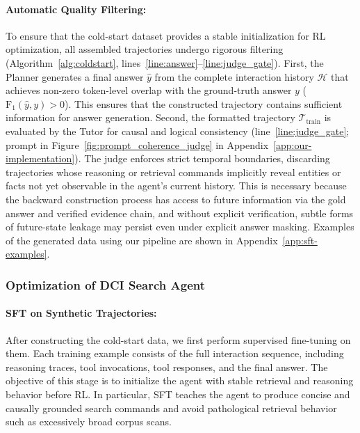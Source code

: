 \documentclass{article} %
\begin{document}
\paragraph{Automatic Quality Filtering:}

To ensure that the cold-start dataset provides a stable initialization for RL optimization, all assembled trajectories undergo rigorous filtering (Algorithm~\ref{alg:coldstart}, lines~\ref{line:answer}--\ref{line:judge_gate}). First, the Planner generates a final answer $\hat{y}$ from the complete interaction history $\mathcal{H}$ that achieves non-zero token-level overlap with the ground-truth answer $y$ ($\mathrm{F_1}(\hat{y}, y) > 0$). This ensures that the constructed trajectory contains sufficient information for answer generation. Second, the formatted trajectory $\mathcal{T}_{\mathrm{train}}$ is evaluated by the Tutor for causal and logical consistency (line~\ref{line:judge_gate}; prompt in Figure~\ref{fig:prompt_coherence_judge} in Appendix~\ref{app:our-implementation}). The judge enforces strict temporal boundaries, discarding trajectories whose reasoning or retrieval commands implicitly reveal entities or facts not yet observable in the agent's current history. This is necessary because the backward construction process has access to future information via the gold answer and verified evidence chain, and without explicit verification, subtle forms of future-state leakage may persist even under explicit answer masking. Examples of the generated data using our pipeline are shown in Appendix~\ref{app:sft-examples}.


\subsubsection{Optimization of DCI Search Agent}

\paragraph{SFT on Synthetic Trajectories:}

After constructing the cold-start data, we first perform supervised fine-tuning on them. Each training example consists of the full interaction sequence, including reasoning traces, tool invocations, tool responses, and the final answer. The objective of this stage is to initialize the agent with stable retrieval and reasoning behavior before RL. In particular, SFT teaches the agent to produce concise and causally grounded search commands and avoid pathological retrieval behavior such as excessively broad corpus scans.
\end{document}
